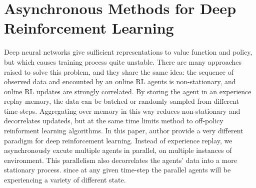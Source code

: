\documentclass[11pt,a4paper]{article}
\begin{document}
\section{Asynchronous Methods for Deep Reinforcement Learning}
Deep neural networks give sufficient representations to value function and policy, but which causes training process quite
unstable. There are many approaches raised to solve this problem, and they share the same idea: the sequence of observed 
data and encounted by an online RL agents is non-stationary, and online RL updates are strongly correlated. By storing the 
agent in an experience replay memory, the data can be batched or randomly sampled from different time-steps. Aggregating over memory in this way reduces non-stationary and decorrelates updateds, but at the same time limits method to off-policy reinforment learning algorithms. In this paper, author provide a very different paradigm for deep reinforcement learning. Instead of experience replay, we asynchronously excute multiple agents in parallel, on multiple instances of environment. This parallelism also decorrelates the agents' data into a more stationary process. since at any given time-step the parallel agents will be experiencing a variety of different state.
\end{document}
